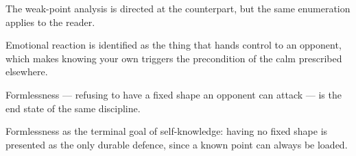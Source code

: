 

\begin{distilled}
  \item The weak-point analysis is directed at the counterpart, but the same enumeration applies to the reader.
  \item Emotional reaction is identified as the thing that hands control to an opponent, which makes knowing your own triggers the precondition of the calm prescribed elsewhere.
  \item Formlessness --- refusing to have a fixed shape an opponent can attack --- is the end state of the same discipline.
\end{distilled}

\begin{unique}
  \item Formlessness as the terminal goal of self-knowledge: having no fixed shape is presented as the only durable defence, since a known point can always be loaded.
\end{unique}
